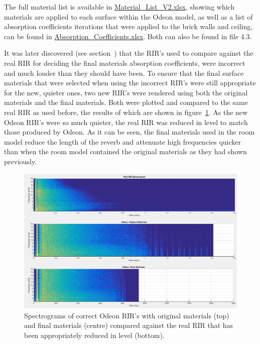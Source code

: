 \documentclass[../../main.tex]{subfiles}
\begin{document}
			The full material list is available in \href{http://lt669.github.io/pages/Material_List_Final.htm}{Material\_List\_V2.xlsx}, showing which materials are applied to each surface within the Odeon model, as well as a list of absorption coefficients iterations that were applied to the brick walls and ceiling, can be found in \href{http://lt669.github.io/pages/Absorption%20Coefficients.htm}{Absorption\_Coefficients.xlsx}. Both can also be found in file 4.3.

			It was later discovered (see section~) that the \ac{RIR}'s used to compare against the real \ac{RIR} for deciding the final materials absorption coefficients, were incorrect and much louder than they should have been. To ensure that the final surface materials that were selected when using the incorrect \ac{RIR}'s were still appropriate for the new, quieter ones, two new \ac{RIR}'s were rendered using both the original materials and the final materials. Both were plotted and compared to the same real \ac{RIR} as used before, the results of which are shown in figure~\ref{compareCorrect}. As the new Odeon \ac{RIR}'s were so much quieter, the real \ac{RIR} was reduced in level to match those produced by Odeon. As it can be seen, the final materials used in the room model reduce the length of the reverb and attenuate high frequencies quicker than when the room model contained the original materials as they had shown previously.  

			\begin{figure}[H]
				\centerline{\includegraphics[scale = 0.4]{Sections/Implementation/Odeon/images/MaterialCompare/NewMaterials/newOdeonComparison.png}}
				\caption{Spectrograms of correct Odeon \ac{RIR}'s with original materials (top) and final materials (centre) compared against the real RIR that has been appropriately reduced in level (bottom).}
				\label{compareCorrect}
			\end{figure}
\end{document}
